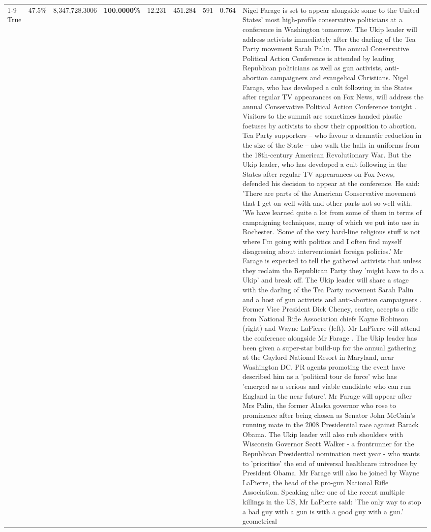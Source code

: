 \begin{table}[H]
\begin{tabular}{lllrlllll}
\cline{1-9}
True & 47.5\% & 8,347,728.3006 & \bfseries \color{red} 100.0000\% & 12.231 & 451.284 & 591 & 0.764 & Nigel Farage is set to appear alongside some to the United States' most high-profile conservative politicians at a conference in Washington tomorrow. The Ukip leader will address activists immediately after the darling of the Tea Party movement Sarah Palin. The annual Conservative Political Action Conference is attended by leading Republican politicians as well as gun activists, anti-abortion campaigners and evangelical Christians. Nigel Farage, who has developed a cult following in the States after regular TV appearances on Fox News, will address the annual Conservative Political Action Conference tonight . Visitors to the summit are sometimes handed plastic foetuses by activists to show their opposition to abortion. Tea Party supporters – who favour a dramatic reduction in the size of the State – also walk the halls in uniforms from the 18th-century American Revolutionary War. But the Ukip leader, who has developed a cult following in the States after regular TV appearances on Fox News, defended his decision to appear at the conference. He said: 'There are parts of the American Conservative movement that I get on well with and other parts not so well with. 'We have learned quite a lot from some of them in terms of campaigning techniques, many of which we put into use in Rochester. 'Some of the very hard-line religious stuff is not where I'm going with politics and I often find myself disagreeing about interventionist foreign policies.' Mr Farage is expected to tell the gathered activists that unless they reclaim the Republican Party they 'might have to do a Ukip' and break off. The Ukip leader will share a stage with the darling of the Tea Party movement Sarah Palin and a host of gun activists and anti-abortion campaigners . Former Vice President Dick Cheney, centre, accepts a rifle from National Rifle Association chiefs Kayne Robinson (right) and Wayne LaPierre (left). Mr LaPierre will attend the conference alongside Mr Farage . The Ukip leader has been given a super-star build-up for the annual gathering at the Gaylord National Resort in Maryland, near Washington DC. PR agents promoting the event have described him as a 'political tour de force' who has 'emerged as a serious and viable candidate who can run England in the near future'. Mr Farage will appear after Mrs Palin, the former Alaska governor who rose to prominence after being chosen as Senator John McCain's running mate in the 2008 Presidential race against Barack Obama. The Ukip leader will also rub shoulders with Wisconsin Governor Scott Walker - a frontrunner for the Republican Presidential nomination next year - who wants to 'prioritise' the end of universal healthcare introduce by President Obama. Mr Farage will also be joined by Wayne LaPierre, the head of the pro-gun National Rifle Association. Speaking after one of the recent multiple killings in the US, Mr LaPierre said: 'The only way to stop a bad guy with a gun is with a good guy with a gun.' geometrical \\

\end{tabular}
\end{table}
